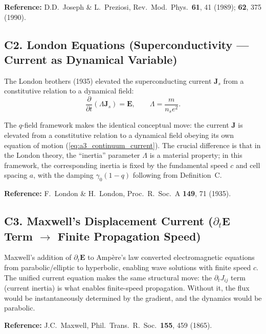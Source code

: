 \documentclass[reprint]{revtex4-2}
\begin{document}
\textbf{Reference:} D.D.\ Joseph \& L.\ Preziosi, Rev.\ Mod.\ Phys.\ \textbf{61}, 41 (1989); \textbf{62}, 375 (1990).

\subsection{C2. London Equations (Superconductivity --- Current as Dynamical Variable)}

The London brothers (1935) elevated the superconducting current $\mathbf{J}_s$ from a constitutive relation to a dynamical field:
\begin{equation}
\frac{\partial}{\partial t}(\Lambda\mathbf{J}_s) = \mathbf{E}, \qquad \Lambda = \frac{m}{n_s e^2}.
\end{equation}

The $q$-field framework makes the identical conceptual move: the current $\mathbf{J}$ is elevated from a constitutive relation to a dynamical field obeying its own equation of motion (\ref{eq:a3_continuum_current}). The crucial difference is that in the London theory, the ``inertia'' parameter $\Lambda$ is a material property; in this framework, the corresponding inertia is fixed by the fundamental speed $c$ and cell spacing $a$, with the damping $\gamma_0(1-q)$ following from Definition~C.

\textbf{Reference:} F.\ London \& H.\ London, Proc.\ R.\ Soc.\ A \textbf{149}, 71 (1935).

\subsection{C3. Maxwell's Displacement Current ($\partial_t\mathbf{E}$ Term $\to$ Finite Propagation Speed)}

Maxwell's addition of $\partial_t\mathbf{E}$ to Amp\`ere's law converted electromagnetic equations from parabolic/elliptic to hyperbolic, enabling wave solutions with finite speed $c$. The unified current equation makes the same structural move: the $\partial_t J_{ij}$ term (current inertia) is what enables finite-speed propagation. Without it, the flux would be instantaneously determined by the gradient, and the dynamics would be parabolic.

\textbf{Reference:} J.C.\ Maxwell, Phil.\ Trans.\ R.\ Soc.\ \textbf{155}, 459 (1865).
\end{document}
